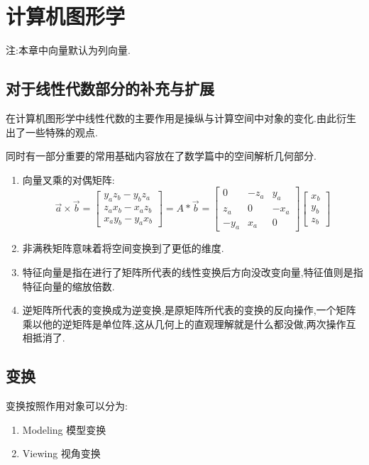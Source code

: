 \chapter{计算机图形学}{
  注:本章中向量默认为列向量.

  \section{对于线性代数部分的补充与扩展}{

    在计算机图形学中线性代数的主要作用是操纵与计算空间中对象的变化.由此衍生出了一些特殊的观点.

    同时有一部分重要的常用基础内容放在了数学篇中的空间解析几何部分.

    \begin{enumerate}
      \item {向量叉乘的对偶矩阵:
            $$\vec{a} \times \vec{b}
              =
              \begin{bmatrix}
                y_az_b - y_bz_a \\
                z_ax_b - x_az_b \\
                x_ay_b - y_ax_b
              \end{bmatrix}
              =
              A * \vec{b}
              =
              \begin{bmatrix}
                0    & -z_a & y_a  \\
                z_a  & 0    & -x_a \\
                -y_a & x_a  & 0
              \end{bmatrix}
              \begin{bmatrix}
                x_b \\
                y_b \\
                z_b
              \end{bmatrix}
            $$
            }
      \item 非满秩矩阵意味着将空间变换到了更低的维度.
      \item 特征向量是指在进行了矩阵所代表的线性变换后方向没改变向量,特征值则是指特征向量的缩放倍数.
      \item 逆矩阵所代表的变换成为逆变换,是原矩阵所代表的变换的反向操作,一个矩阵乘以他的逆矩阵是单位阵,这从几何上的直观理解就是什么都没做,两次操作互相抵消了.
    \end{enumerate}
   }%

  \section{变换}{
    变换按照作用对象可以分为:
    \begin{enumerate}
      \item Modeling 模型变换
      \item Viewing 视角变换
    \end{enumerate}

}}
